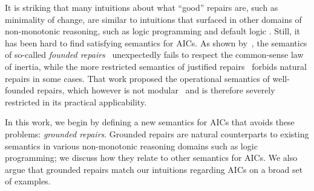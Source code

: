 
It is striking that many intuitions about what ``good'' repairs are, such as minimality of change, are similar to intuitions that surfaced in other domains of non-monotonic reasoning, such as logic programming  and default logic . 
Still, it has been hard to find satisfying semantics for AICs.
As shown by~\citet{tase/Cruz-FilipeGEN13}, the semantics of so-called \emph{founded repairs}~\cite{iclp/CaropreseGSZ06} unexpectedly fails to respect the common-sense law of inertia, while the more restricted semantics of justified repairs~\cite{tplp/CaropreseT11} forbids natural repairs in some cases.
That work proposed the operational semantics of well-founded repairs, which however is not modular~\cite{foiks/Cruz-Filipe14} and is therefore severely restricted in its practical applicability.


In this work, we begin by defining a new semantics for AICs that avoids these problems: \emph{grounded repairs}.
Grounded repairs are natural counterparts to existing semantics in various non-monotonic reasoning domains such as logic programming; we discuss how they relate to other semantics for AICs.
We also argue that grounded repairs match our intuitions regarding AICs on a broad set of examples. 

